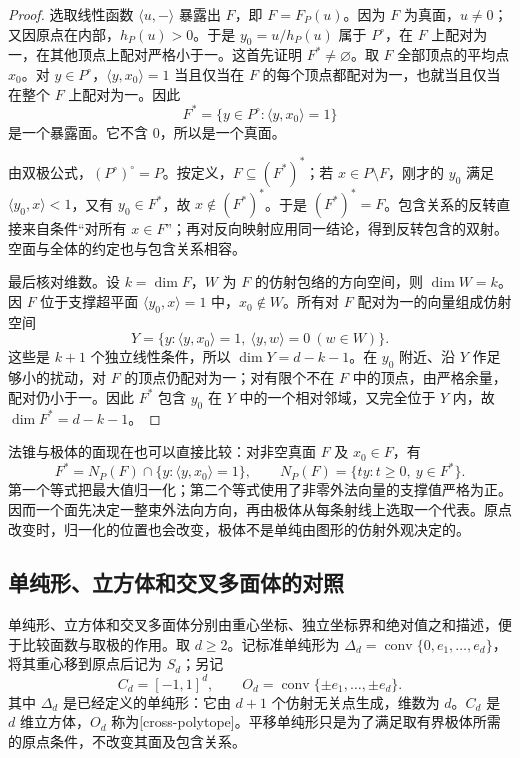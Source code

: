 \begin{proof}
	选取线性函数 \(\langle u,-\rangle\) 暴露出 \(F\)，即 \(F=F_P(u)\)。因为 \(F\) 为真面，\(u\ne0\)；又因原点在内部，\(h_P(u)>0\)。于是 \(y_0=u/h_P(u)\) 属于 \(P^\circ\)，在 \(F\) 上配对为一，在其他顶点上配对严格小于一。这首先证明 \(F^*\ne\varnothing\)。取 \(F\) 全部顶点的平均点 \(x_0\)。对 \(y\in P^\circ\)，\(\langle y,x_0\rangle=1\) 当且仅当在 \(F\) 的每个顶点都配对为一，也就当且仅当在整个 \(F\) 上配对为一。因此
	\[
		F^*=\{y\in P^\circ:\langle y,x_0\rangle=1\}
	\]
	是一个暴露面。它不含 \(0\)，所以是一个真面。

	由双极公式，\((P^\circ)^\circ=P\)。按定义，\(F\subseteq(F^*)^*\)；若 \(x\in P\setminus F\)，刚才的 \(y_0\) 满足 \(\langle y_0,x\rangle<1\)，又有 \(y_0\in F^*\)，故 \(x\notin(F^*)^*\)。于是 \((F^*)^*=F\)。包含关系的反转直接来自条件“对所有 \(x\in F\)”；再对反向映射应用同一结论，得到反转包含的双射。空面与全体的约定也与包含关系相容。

	最后核对维数。设 \(k=\dim F\)，\(W\) 为 \(F\) 的仿射包络的方向空间，则 \(\dim W=k\)。因 \(F\) 位于支撑超平面 \(\langle y_0,x\rangle=1\) 中，\(x_0\notin W\)。所有对 \(F\) 配对为一的向量组成仿射空间
	\[
		Y=\{y:\langle y,x_0\rangle=1,\ \langle y,w\rangle=0\ (w\in W)\}.
	\]
	这些是 \(k+1\) 个独立线性条件，所以 \(\dim Y=d-k-1\)。在 \(y_0\) 附近、沿 \(Y\) 作足够小的扰动，对 \(F\) 的顶点仍配对为一；对有限个不在 \(F\) 中的顶点，由严格余量，配对仍小于一。因此 \(F^*\) 包含 \(y_0\) 在 \(Y\) 中的一个相对邻域，又完全位于 \(Y\) 内，故 \(\dim F^*=d-k-1\)。
\end{proof}

法锥与极体的面现在也可以直接比较：对非空真面 \(F\) 及 \(x_0\in F\)，有
\[
	F^*=N_P(F)\cap\{y:\langle y,x_0\rangle=1\},\qquad N_P(F)=\{ty:t\ge0,\ y\in F^*\}.
\]
第一个等式把最大值归一化；第二个等式使用了非零外法向量的支撑值严格为正。因而一个面先决定一整束外法向方向，再由极体从每条射线上选取一个代表。原点改变时，归一化的位置也会改变，极体不是单纯由图形的仿射外观决定的。

\subsection{单纯形、立方体和交叉多面体的对照}
\label{g1:subsec:0303:05}

单纯形、立方体和交叉多面体分别由重心坐标、独立坐标界和绝对值之和描述，便于比较面数与取极的作用。取 \(d\ge2\)。记标准单纯形为 \(\Delta_d=\operatorname{conv}\{0,e_1,\ldots,e_d\}\)，将其重心移到原点后记为 \(S_d\)；另记
\[
	C_d=[-1,1]^d,\qquad O_d=\operatorname{conv}\{\pm e_1,\ldots,\pm e_d\}.
\]
其中 \(\Delta_d\) 是已经定义的单纯形：它由 \(d+1\) 个仿射无关点生成，维数为 \(d\)。\(C_d\) 是 \(d\) 维立方体，\(O_d\) 称为[cross-polytope]。平移单纯形只是为了满足取有界极体所需的原点条件，不改变其面及包含关系。

